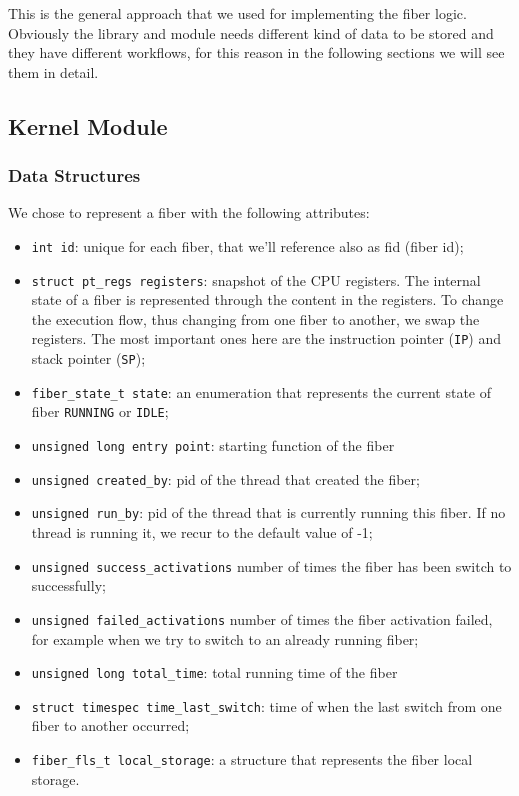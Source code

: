 \documentclass[a4paper,10pt]{article}
\begin{document}
 This is the general approach that we used for implementing the fiber logic. Obviously the library and module needs different kind of data to be stored and they have different workflows, for this reason in the following sections we will see them in detail.

\subsection{Kernel Module}
\subsubsection{Data Structures}\label{subsubsec:kern-datas}
  We chose to represent a fiber with the following attributes:
  \begin{itemize}
    \item \lstinline{int id}: unique for each fiber, that we’ll reference also as fid (fiber id);
    \item \lstinline{struct pt_regs registers}: snapshot of the CPU registers. The internal state of a fiber is represented through the content in the registers. To change the execution flow, thus changing from one fiber to another, we swap the registers. The most important ones here are the instruction pointer (\texttt{IP}) and stack pointer (\texttt{SP});
    \item \lstinline{fiber_state_t state}: an enumeration that represents the current state of fiber \lstinline{RUNNING} or \lstinline{IDLE};
    \item \lstinline{unsigned long entry point}: starting function of the fiber
    \item \lstinline{unsigned created_by}: pid of the thread that created the fiber;
    \item \lstinline{unsigned run_by}: pid of the thread that is currently running this fiber. If no thread is running it, we recur to the default value of -1;
    \item \lstinline{unsigned success_activations} number of times the fiber has been switch to successfully;
    \item \lstinline{unsigned failed_activations} number of times the fiber activation failed, for example when we try to switch to an already running fiber;
    \item \lstinline{unsigned long total_time}: total running time of the fiber
    \item \lstinline{struct timespec time_last_switch}: time of when the last switch from one fiber to another occurred;
    \item \lstinline{fiber_fls_t local_storage}: a structure that represents the fiber local storage.
  \end{itemize}
\end{document}
